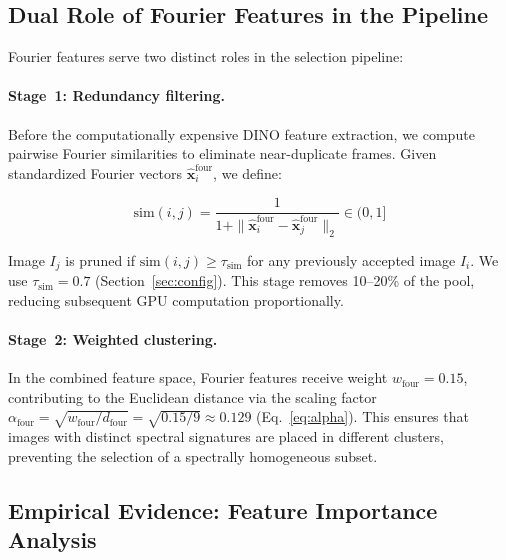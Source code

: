 \subsection{Dual Role of Fourier Features in the Pipeline}
\label{sec:fourier_dual_role}

Fourier features serve two distinct roles in the selection pipeline:

\paragraph{Stage~1: Redundancy filtering.}
Before the computationally expensive DINO feature extraction, we compute
pairwise Fourier similarities to eliminate near-duplicate frames.  Given
standardized Fourier vectors $\hat{\mathbf{x}}_i^{\text{four}}$, we define:

\begin{equation}
    \text{sim}(i, j) = \frac{1}{1 + \|\hat{\mathbf{x}}_i^{\text{four}}
                              - \hat{\mathbf{x}}_j^{\text{four}}\|_2}
    \in (0, 1]
\end{equation}

Image $I_j$ is pruned if $\text{sim}(i, j) \geq \tau_{\text{sim}}$ for any
previously accepted image $I_i$.  We use $\tau_{\text{sim}} = 0.7$
(Section~\ref{sec:config}).  This stage removes 10--20\% of the pool,
reducing subsequent GPU computation proportionally.

\paragraph{Stage~2: Weighted clustering.}
In the combined feature space, Fourier features receive weight
$w_{\text{four}} = 0.15$, contributing to the Euclidean distance via the
scaling factor $\alpha_{\text{four}} = \sqrt{w_{\text{four}} / d_{\text{four}}}
= \sqrt{0.15/9} \approx 0.129$ (Eq.~\ref{eq:alpha}).  This ensures that images
with distinct spectral signatures are placed in different clusters, preventing
the selection of a spectrally homogeneous subset.


\subsection{Empirical Evidence: Feature Importance Analysis}
\label{sec:feature_importance}

